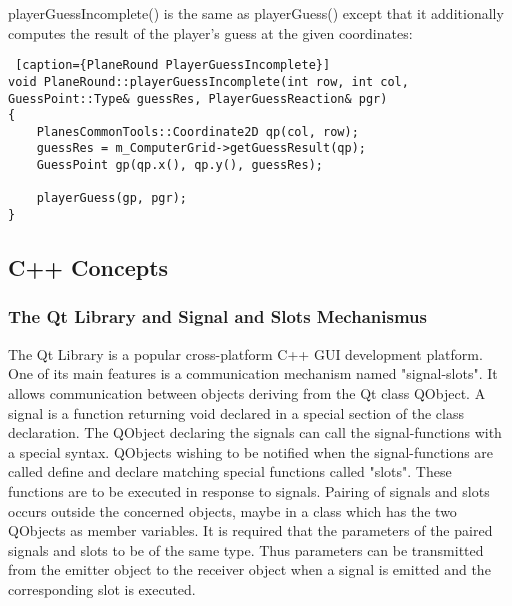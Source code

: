 playerGuessIncomplete() is the same as playerGuess() except that it additionally  computes the result of the player's guess at the given coordinates:

\begin {lstlisting} [caption={PlaneRound PlayerGuessIncomplete}]
void PlaneRound::playerGuessIncomplete(int row, int col, GuessPoint::Type& guessRes, PlayerGuessReaction& pgr)
{
	PlanesCommonTools::Coordinate2D qp(col, row);
	guessRes = m_ComputerGrid->getGuessResult(qp);
	GuessPoint gp(qp.x(), qp.y(), guessRes);
	
	playerGuess(gp, pgr);
}
\end{lstlisting}

\subsection{C++ Concepts}

\subsubsection{The Qt Library and Signal and Slots Mechanismus} \label {Qt_Signals_Slots}

The Qt Library is a popular cross-platform C++ GUI development platform. One of its main features is a communication mechanism named "signal-slots". It allows communication between objects deriving from the Qt class QObject. A signal is a function returning void declared in a special section of the class declaration. The QObject declaring the signals can call the signal-functions with a special syntax. QObjects wishing to be notified when the signal-functions are called define and declare matching special functions called "slots". These functions are to be executed in response to signals. Pairing of signals and slots occurs outside the concerned objects, maybe in a class which has the two QObjects as member variables. It is required that the parameters of the paired signals and slots to be of the same type. Thus parameters can be transmitted from the emitter object to the receiver object when a signal is emitted and the corresponding slot is executed. 


